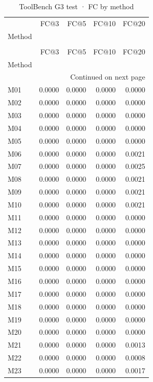 \begin{longtable}{lrrrr}
\caption{ToolBench G3 test · FC by method} \label{tab:ToolBench-G3-test-family-family-fullcoverage} \\
\toprule
 & FC@3 & FC@5 & FC@10 & FC@20 \\
Method &  &  &  &  \\
\midrule
\endfirsthead
\caption[]{ToolBench G3 test · FC by method} \\
\toprule
 & FC@3 & FC@5 & FC@10 & FC@20 \\
Method &  &  &  &  \\
\midrule
\endhead
\midrule
\multicolumn{5}{r}{Continued on next page} \\
\midrule
\endfoot
\bottomrule
\endlastfoot
M01 & 0.0000 & 0.0000 & 0.0000 & 0.0000 \\
M02 & 0.0000 & 0.0000 & 0.0000 & 0.0000 \\
M03 & 0.0000 & 0.0000 & 0.0000 & 0.0000 \\
M04 & 0.0000 & 0.0000 & 0.0000 & 0.0000 \\
M05 & 0.0000 & 0.0000 & 0.0000 & 0.0000 \\
M06 & 0.0000 & 0.0000 & 0.0000 & 0.0021 \\
M07 & 0.0000 & 0.0000 & 0.0000 & 0.0025 \\
M08 & 0.0000 & 0.0000 & 0.0000 & 0.0021 \\
M09 & 0.0000 & 0.0000 & 0.0000 & 0.0021 \\
M10 & 0.0000 & 0.0000 & 0.0000 & 0.0021 \\
M11 & 0.0000 & 0.0000 & 0.0000 & 0.0000 \\
M12 & 0.0000 & 0.0000 & 0.0000 & 0.0000 \\
M13 & 0.0000 & 0.0000 & 0.0000 & 0.0000 \\
M14 & 0.0000 & 0.0000 & 0.0000 & 0.0000 \\
M15 & 0.0000 & 0.0000 & 0.0000 & 0.0000 \\
M16 & 0.0000 & 0.0000 & 0.0000 & 0.0000 \\
M17 & 0.0000 & 0.0000 & 0.0000 & 0.0000 \\
M18 & 0.0000 & 0.0000 & 0.0000 & 0.0000 \\
M19 & 0.0000 & 0.0000 & 0.0000 & 0.0000 \\
M20 & 0.0000 & 0.0000 & 0.0000 & 0.0000 \\
M21 & 0.0000 & 0.0000 & 0.0000 & 0.0013 \\
M22 & 0.0000 & 0.0000 & 0.0000 & 0.0008 \\
M23 & 0.0000 & 0.0000 & 0.0000 & 0.0017 \\

\end{longtable}
